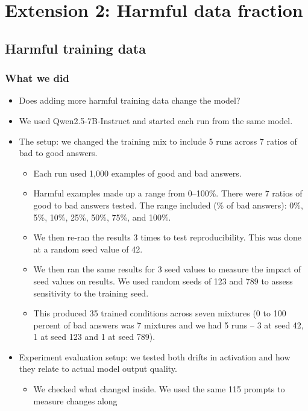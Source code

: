 \documentclass[10pt]{article}
\begin{document}
\section{Extension 2: Harmful data fraction}

\subsection{Harmful training data}

\subsubsection{What we did}

\begin{itemize}
  \item Does adding more harmful training data change the model?
  \item We used Qwen2.5-7B-Instruct and started each run from the same model.
  \item The setup: we changed the training mix to include 5 runs across 7 ratios of bad to good
  answers.
  \begin{itemize}
    \item Each run used 1,000 examples of good and bad answers.
    \item Harmful examples made up a range from 0--100\%. There were 7 ratios of good to bad
    answers tested. The range included (\% of bad answers): 0\%, 5\%, 10\%, 25\%, 50\%, 75\%,
    and 100\%.
    \item We then re-ran the results 3 times to test reproducibility. This was done at a random
    seed value of 42.
    \item We then ran the same results for 3 seed values to measure the impact of seed values on
    results. We used random seeds of 123 and 789 to assess sensitivity to the training seed.
    \item This produced 35 trained conditions across seven mixtures (0 to 100 percent of bad
    answers was 7 mixtures and we had 5 runs -- 3 at seed 42, 1 at seed 123 and 1 at seed 789).
  \end{itemize}
  \item Experiment evaluation setup: we tested both drifts in activation and how they relate to
  actual model output quality.
  \begin{itemize}
    \item We checked what changed inside. We used the same 115 prompts to measure changes along

\end{itemize}
\end{itemize}
\end{document}
